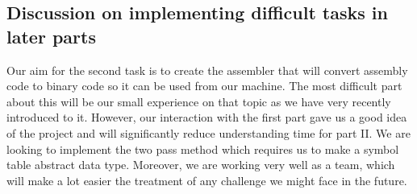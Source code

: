 \documentclass{article}
\begin{document}
\bigskip
\subsection{Discussion on implementing difficult tasks in later parts}
Our aim for the second task is to create the assembler that will convert
assembly code to binary code so it can be used from our machine. The most 
difficult part about this will be our small experience on that topic as we have
very recently introduced to it. However, our interaction with the first part gave us a good idea of 
the project and will significantly reduce understanding time for part II. We are looking to implement
the two pass method which requires us to make a symbol table abstract data type.
Moreover, we are working very well as a team, which will make a lot easier
 the treatment of any challenge we might face in the future.
\end{document}
